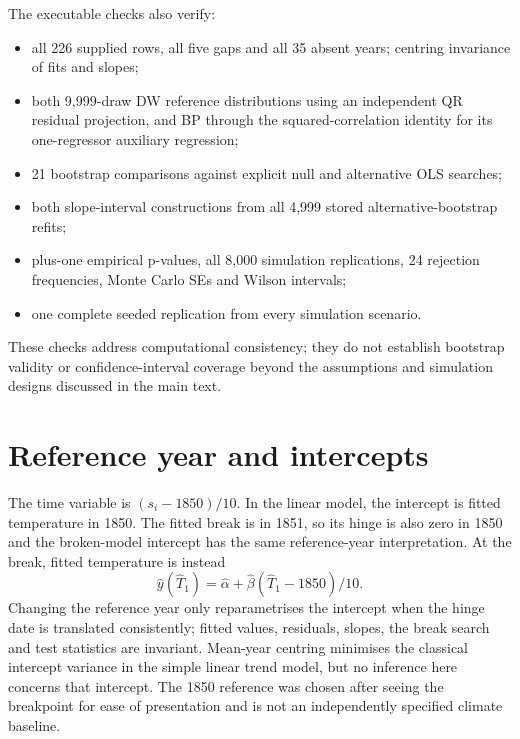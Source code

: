 \documentclass[11pt,a4paper]{article}
\begin{document}
The executable checks also verify:
\begin{itemize}
\item all 226 supplied rows, all five gaps and all 35 absent years; centring invariance of fits and slopes;
\item both 9,999-draw DW reference distributions using an independent QR residual projection, and BP through the squared-correlation identity for its one-regressor auxiliary regression;
\item 21 bootstrap comparisons against explicit null and alternative OLS searches;
\item both slope-interval constructions from all 4,999 stored alternative-bootstrap refits;
\item plus-one empirical p-values, all 8,000 simulation replications, 24 rejection frequencies, Monte Carlo SEs and Wilson intervals;
\item one complete seeded replication from every simulation scenario.
\end{itemize}
These checks address computational consistency; they do not establish bootstrap validity or confidence-interval coverage beyond the assumptions and simulation designs discussed in the main text.

\clearpage\section{Reference year and intercepts}\label{app:centring}
The time variable is $(s_i-1850)/10$. In the linear model, the intercept is fitted temperature in 1850. The fitted break is in 1851, so its hinge is also zero in 1850 and the broken-model intercept has the same reference-year interpretation. At the break, fitted temperature is instead
\[
\widehat y(\widehat T_1)=\widehat\alpha+
\widehat\beta(\widehat T_1-1850)/10.
\]
Changing the reference year only reparametrises the intercept when the hinge date is translated consistently; fitted values, residuals, slopes, the break search and test statistics are invariant. Mean-year centring minimises the classical intercept variance in the simple linear trend model, but no inference here concerns that intercept. The 1850 reference was chosen after seeing the breakpoint for ease of presentation and is not an independently specified climate baseline.
\end{document}

